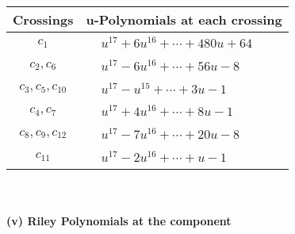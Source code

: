 \documentclass[1p]{elsarticle_modified}
\theoremstyle{definition}
\begin{document}
\begin{tabular}{m{50pt}|m{274pt}}
Crossings & \hspace{64pt}u-Polynomials at each crossing \\
\hline $$\begin{aligned}c_{1}\end{aligned}$$&$\begin{aligned}
&u^{17}+6 u^{16}+\cdots+480 u+64
\end{aligned}$\\
\hline $$\begin{aligned}c_{2},c_{6}\end{aligned}$$&$\begin{aligned}
&u^{17}-6 u^{16}+\cdots+56 u-8
\end{aligned}$\\
\hline $$\begin{aligned}c_{3},c_{5},c_{10}\end{aligned}$$&$\begin{aligned}
&u^{17}- u^{15}+\cdots+3 u-1
\end{aligned}$\\
\hline $$\begin{aligned}c_{4},c_{7}\end{aligned}$$&$\begin{aligned}
&u^{17}+4 u^{16}+\cdots+8 u-1
\end{aligned}$\\
\hline $$\begin{aligned}c_{8},c_{9},c_{12}\end{aligned}$$&$\begin{aligned}
&u^{17}-7 u^{16}+\cdots+20 u-8
\end{aligned}$\\
\hline $$\begin{aligned}c_{11}\end{aligned}$$&$\begin{aligned}
&u^{17}-2 u^{16}+\cdots+u-1
\end{aligned}$\\
\hline
\end{tabular}\\~\\
\newpage\renewcommand{\arraystretch}{1}
\flushleft \textbf{(v) Riley Polynomials at the component}\newline \\
\end{document}
